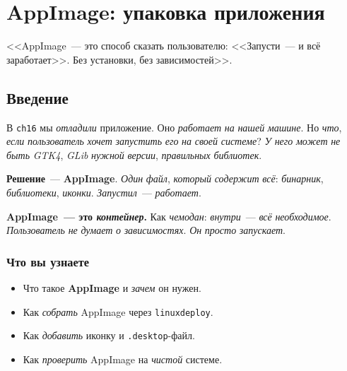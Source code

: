
\chapter{AppImage: упаковка приложения}
\label{ch:appimage}

\epigraph{<<AppImage~--- это способ сказать пользователю:
<<Запусти~--- и всё заработает>>. Без установки, без зависимостей>>.}{}

\section{Введение}
\label{sec:appimage-intro}

В \texttt{ch16} мы \emph{отладили} приложение. Оно \emph{работает}
\emph{на} \emph{нашей} \emph{машине}. Но \emph{что}, \emph{если}
\emph{пользователь} \emph{хочет} \emph{запустить} \emph{его} \emph{на}
\emph{своей} \emph{системе}? \emph{У} \emph{него} \emph{может} \emph{не}
\emph{быть} \emph{GTK4}, \emph{GLib} \emph{нужной} \emph{версии},
\emph{правильных} \emph{библиотек}.

\textbf{Решение}~--- \textbf{AppImage}. \emph{Один} \emph{файл},
\emph{который} \emph{содержит} \emph{всё}: \emph{бинарник},
\emph{библиотеки}, \emph{иконки}. \emph{Запустил}~---
\emph{работает}.

\begin{ideabox}
\textbf{AppImage~--- это \emph{контейнер}.} Как \emph{чемодан}:
\emph{внутри}~--- \emph{всё} \emph{необходимое}. \emph{Пользователь}
\emph{не} \emph{думает} \emph{о} \emph{зависимостях}. \emph{Он}
\emph{просто} \emph{запускает}.
\end{ideabox}

\subsection{Что вы узнаете}

\begin{itemize}
    \item Что такое \textbf{AppImage} и \emph{зачем} он нужен.
    \item Как \emph{собрать} AppImage через \texttt{linuxdeploy}.
    \item Как \emph{добавить} иконку и \texttt{.desktop}-файл.
    \item Как \emph{проверить} AppImage на \emph{чистой} системе.
\end{itemize}

